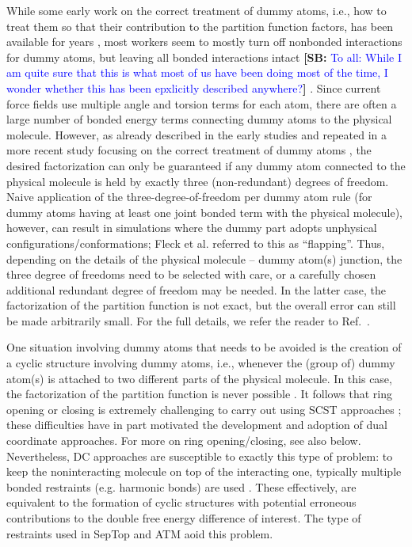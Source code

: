 \documentclass[9pt,bestpractices]{livecoms}
\newcommand{\sbnote}[1]{%
  {\bfseries{}[SB: }%
  {\textcolor{blue}{#1}}{\bfseries{}]}
  }
\begin{document}
While some early work on the correct treatment of dummy atoms, i.e., how to treat them so that their contribution to the partition function factors, has been available for years \cite{Boresch_2002,Shobana_2000,Wang_2012}, most workers seem to mostly turn off nonbonded interactions for dummy atoms, but leaving all bonded interactions intact \sbnote{To all: While I am quite sure that this is what most of us have been doing most of the time, I wonder whether this has been epxlicitly described anywhere?}. Since current force fields use multiple angle and torsion terms for each atom, there are often a large number of bonded energy terms connecting dummy atoms to the physical molecule. However, as already described in the early studies and repeated in a more recent study focusing on the correct treatment of dummy atoms \cite{Fleck_2021}, the desired factorization can only be guaranteed if any dummy atom connected to the physical molecule is held by exactly three (non-redundant) degrees of freedom. Naive application of the three-degree-of-freedom per dummy atom rule (for dummy atoms having at least one joint bonded term with the physical molecule), however, can result in simulations where the dummy part adopts unphysical configurations/conformations; Fleck et al. referred to this as “flapping”. Thus, depending on the details of the physical molecule -- dummy atom(s) junction, the three degree of freedoms need to be selected with care, or a carefully chosen additional redundant degree of freedom may be needed. In the latter case, the factorization of the partition function is not exact, but the overall error can still be made arbitrarily small. For the full details, we refer the reader to Ref.~\cite{Fleck_2021}. 

One situation involving dummy atoms that needs to be avoided is the creation of a cyclic structure involving dummy atoms, i.e., whenever the (group of) dummy atom(s) is attached to two different parts of the physical molecule. In this case, the factorization of the partition function is never possible \cite{Shobana_2000}. It follows that ring opening or closing is extremely challenging to carry out using SCST approaches \cite{liu2015ring}; these difficulties have in part motivated the development and adoption of dual coordinate approaches. For more on ring opening/closing, see also below. Nevertheless, DC approaches are susceptible to exactly this type of problem: to keep the noninteracting molecule on top of the interacting one, typically multiple bonded restraints (e.g. harmonic bonds) are used \cite{Axelsen_1998,Ries_2022}. These effectively, are equivalent to the formation of cyclic structures with potential erroneous contributions to the double free energy difference of interest. The type of restraints used in SepTop \cite{rocklin2013separated,Baumann_2023} and ATM \cite{Azimi_2022} aoid this problem.
\end{document}
